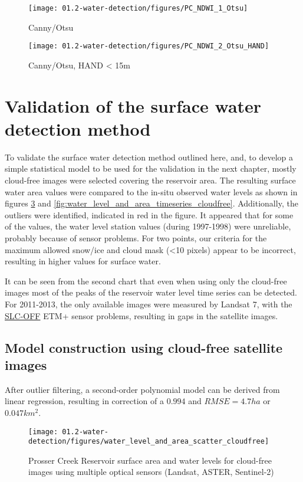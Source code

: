 \begin{figure}[H]
	\centering
	\texttt{[image: 01.2-water-detection/figures/PC\_NDWI\_1\_Otsu]}
	\caption{Canny/Otsu}
	\label{fig:r1_canny_otsu}
\end{figure}

\begin{figure}[H]
	\centering
	\texttt{[image: 01.2-water-detection/figures/PC\_NDWI\_2\_Otsu\_HAND]}
	\caption{Canny/Otsu, HAND < 15m}
	\label{fig:r1_canny_otsu_hand}
\end{figure}

\section{Validation of the surface water detection method}

To validate the surface water detection method outlined here, and, to develop a simple statistical model to be used for the validation in the next chapter, mostly cloud-free images were selected covering the reservoir area. The resulting surface water area values were compared to the in-situ observed water levels as shown in figures \ref{fig:scatter_fit} and \ref{fig:water_level_and_area_timeseries_cloudfree}. Additionally, the outliers were identified, indicated in red in the figure. It appeared that for some of the values, the water level station values (during 1997-1998) were unreliable, probably because of sensor problems. For two points, our criteria for the maximum allowed snow/ice and cloud mask (<10 pixels) appear to be incorrect, resulting in higher values for surface water.

It can be seen from the second chart that even when using only the cloud-free images most of the peaks of the reservoir water level time series can be detected. For 2011-2013, the only available images were measured by Landsat 7, with the \href{https://landsat.usgs.gov/slc-products-background}{SLC-OFF} ETM+ sensor problems, resulting in gaps in the satellite images.

\subsection{Model construction using cloud-free satellite images}

After outlier filtering, a second-order polynomial model can be derived from linear regression, resulting in correction of a $0.994$ and $RMSE = 4.7ha$ or $0.047km^2$.

\begin{figure}[H]
	\centering
	\texttt{[image: 01.2-water-detection/figures/water\_level\_and\_area\_scatter\_cloudfree]}
	\caption{Prosser Creek Reservoir surface area and water levels for cloud-free images using multiple optical sensors (Landsat, ASTER, Sentinel-2)}
	\label{fig:scatter_fit}
\end{figure}


